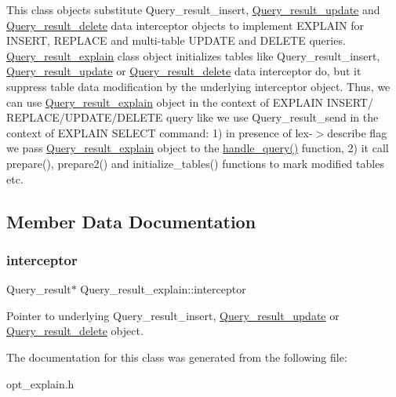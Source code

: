 This class objects substitute Query\+\_\+result\+\_\+insert, \mbox{\hyperlink{classQuery__result__update}{Query\+\_\+result\+\_\+update}} and \mbox{\hyperlink{classQuery__result__delete}{Query\+\_\+result\+\_\+delete}} data interceptor objects to implement E\+X\+P\+L\+A\+IN for I\+N\+S\+E\+RT, R\+E\+P\+L\+A\+CE and multi-\/table U\+P\+D\+A\+TE and D\+E\+L\+E\+TE queries. \mbox{\hyperlink{classQuery__result__explain}{Query\+\_\+result\+\_\+explain}} class object initializes tables like Query\+\_\+result\+\_\+insert, \mbox{\hyperlink{classQuery__result__update}{Query\+\_\+result\+\_\+update}} or \mbox{\hyperlink{classQuery__result__delete}{Query\+\_\+result\+\_\+delete}} data interceptor do, but it suppress table data modification by the underlying interceptor object. Thus, we can use \mbox{\hyperlink{classQuery__result__explain}{Query\+\_\+result\+\_\+explain}} object in the context of E\+X\+P\+L\+A\+IN I\+N\+S\+E\+R\+T/ R\+E\+P\+L\+A\+C\+E/\+U\+P\+D\+A\+T\+E/\+D\+E\+L\+E\+TE query like we use Query\+\_\+result\+\_\+send in the context of E\+X\+P\+L\+A\+IN S\+E\+L\+E\+CT command\+: 1) in presence of lex-\/$>$describe flag we pass \mbox{\hyperlink{classQuery__result__explain}{Query\+\_\+result\+\_\+explain}} object to the \mbox{\hyperlink{group__Query__Optimizer_gae77d58d476f44178e469e2cbe16e9e01}{handle\+\_\+query()}} function, 2) it call prepare(), prepare2() and initialize\+\_\+tables() functions to mark modified tables etc. 

\subsection{Member Data Documentation}
\mbox{\label{classQuery__result__explain_abc8bbaa560825ef50d349690eee44037}} 
\subsubsection{\texorpdfstring{interceptor}{interceptor}}
{\footnotesize\ttfamily Query\+\_\+result$\ast$ Query\+\_\+result\+\_\+explain\+::interceptor\hspace{0.3cm}{\ttfamily [protected]}}

Pointer to underlying Query\+\_\+result\+\_\+insert, \mbox{\hyperlink{classQuery__result__update}{Query\+\_\+result\+\_\+update}} or \mbox{\hyperlink{classQuery__result__delete}{Query\+\_\+result\+\_\+delete}} object. 

The documentation for this class was generated from the following file\+:\begin{DoxyCompactItemize}
\item 
opt\+\_\+explain.\+h\end{DoxyCompactItemize}
